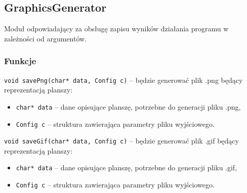 \documentclass{article}
\begin{document}
\subsection{GraphicsGenerator}
Moduł odpowiadający za obsługę zapisu wyników działania programu w zależności od argumentów.

\subsubsection{Funkcje}
\texttt{void savePng(char* data, Config c)} -- będzie generować plik .png będący reprezentacją planszy:
\begin{itemize}[label={}]
	\item \texttt{char* data} -- dane opisujące planszę, potrzebne do generacji pliku .png,
	\item \texttt{Config c} -- struktura zawierająca parametry pliku wyjściowego.
\end{itemize}
	
\noindent{}\texttt{void saveGif(char* data, Config c)} -- będzie generować plik .gif będący reprezentacją planszy:
\begin{itemize}[label={}]
	\item \texttt{char* data} -- dane opisujące planszę, potrzebne do generacji pliku .gif,
	\item \texttt{Config c} -- struktura zawierająca parametry pliku wyjściowego.
\end{itemize}
\end{document}
